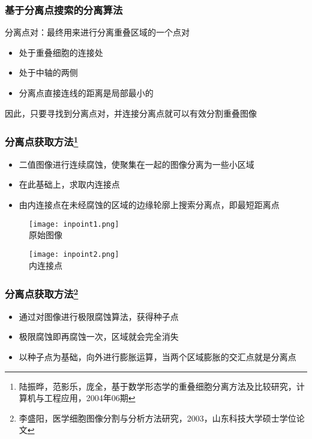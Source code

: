 \documentclass[notheorems,mathserif,table,compress]{beamer}  %
\begin{document}
\begin{frame}
  \frametitle{基于分离点搜索的分离算法}
   分离点对：最终用来进行分离重叠区域的一个点对
   \begin{itemize}
   \item 处于重叠细胞的连接处
   \item 处于中轴的两侧
   \item 分离点直接连线的距离是局部最小的\newline
   \end{itemize}
   因此，只要寻找到分离点对，并连接分离点就可以有效分割重叠图像
\end{frame} 


\begin{frame}
  \frametitle{分离点获取方法\footnote{陆振晔，范影乐，庞全，基于数学形态学的重叠细胞分离方法及比较研究，计算机与工程应用，2004年06期}}
   \begin{itemize}
   \item 二值图像进行连续腐蚀，使聚集在一起的图像分离为一些小区域
   \item 在此基础上，求取内连接点
   \item 由内连接点在未经腐蚀的区域的边缘轮廓上搜索分离点，即最短距离点
   \end{itemize}
  \begin{figure}
   \begin{minipage}[t]{0.4\textwidth} 
     \centering 
     \texttt{[image: inpoint1.png]} \\
     原始图像
   \end{minipage}
   \begin{minipage}[t]{0.4\textwidth} 
     \centering 
     \texttt{[image: inpoint2.png]} \\
     内连接点
   \end{minipage}
   \end{figure}
\end{frame} 


\begin{frame}
  \frametitle{分离点获取方法\footnote{李盛阳，医学细胞图像分割与分析方法研究，2003，山东科技大学硕士学位论文}}
   \begin{itemize}
   \item 通过对图像进行极限腐蚀算法，获得种子点
   \item 极限腐蚀即再腐蚀一次，区域就会完全消失
   \item 以种子点为基础，向外进行膨胀运算，当两个区域膨胀的交汇点就是分离点
   \end{itemize}
\end{frame} 
\end{document}
